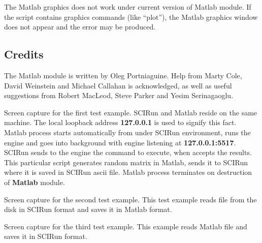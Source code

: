The Matlab graphics does not work under current version of Matlab module.
If the script contains graphics commands (like ``plot''), the 
Matlab graphics window does not appear and the error may be produced.

\subsection{Credits} \indent

The Matlab module is written by Oleg Portniaguine. Help
from Marty Cole, David Weinstein  and Michael Callahan 
is acknowledged, as well as useful suggestions from Robert 
MacLeod, Steve Parker and Yesim Serinagaoglu. 

{
Screen capture for the first test example. SCIRun and Matlab reside on
the same machine. The local loopback address {\bf 127.0.0.1} is used
to signify this fact. Matlab process starts automatically from under SCIRun
environment, runs the engine and goes into background with engine listening
at {\bf 127.0.0.1:5517}. SCIRun sends to the engine the command
to execute, when accepts the results. This particular script generates
random matrix in Matlab, sends it to SCIRun where it is saved in SCIRun
ascii file. Matlab process terminates on destruction
of {\bf Matlab} module.
}

{
Screen capture for the second test example. This test example reads
file from the disk in SCIRun format and saves it in Matlab format.
}

{
Screen capture for the third test example. This example reads
Matlab file and saves it in SCIRun format.
} 



